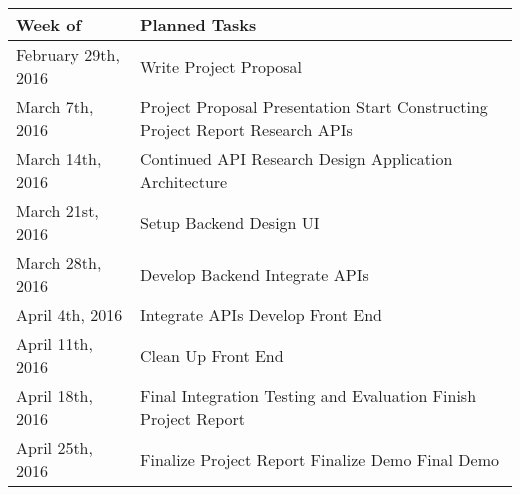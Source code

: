 \section*{}
\begin{center}
  \begin{tabular}{|p{3.5cm}|p{6cm}|}
    \hline 
    \textbf{Week of} & \textbf{Planned Tasks} \\ \hline \hline
    February 29th, 2016 & Write Project Proposal \\ \hline
    March 7th, 2016 & Project Proposal Presentation \newline
						Start Constructing Project Report \newline
						Research APIs \\ \hline
    March 14th, 2016 & Continued API Research \newline
						Design Application Architecture \\ \hline
    March 21st, 2016 & Setup Backend \newline
						Design UI \\ \hline
    March 28th, 2016 & Develop Backend \newline
						Integrate APIs \\ \hline
    April 4th, 2016 & Integrate APIs \newline
						Develop Front End \\ \hline
    April 11th, 2016 & Clean Up Front End \\ \hline
    April 18th, 2016 & Final Integration \newline
    					Testing and Evaluation \newline
						Finish Project Report \\ \hline
    April 25th, 2016 & Finalize Project Report \newline
						Finalize Demo \newline
						Final Demo \\ \hline
  \end{tabular}
\end{center}

\pagebreak




